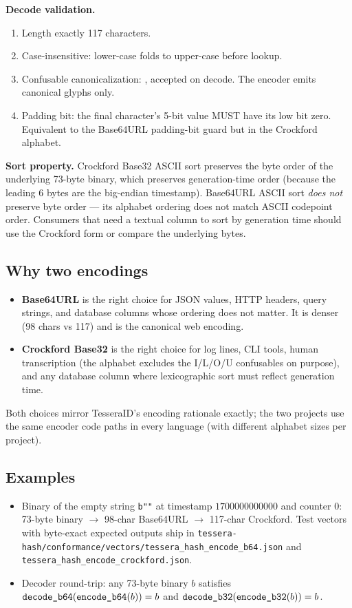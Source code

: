 \textbf{Decode validation.}
\begin{enumerate}
  \item Length exactly 117 characters.
  \item Case-insensitive: lower-case folds to upper-case before lookup.
  \item Confusable canonicalization: ,  accepted on decode. The encoder emits canonical glyphs only.
  \item Padding bit: the final character's 5-bit value MUST have its low bit zero. Equivalent to the Base64URL padding-bit guard but in the Crockford alphabet.
\end{enumerate}

\textbf{Sort property.} Crockford Base32 ASCII sort preserves the byte order of the underlying 73-byte binary, which preserves generation-time order (because the leading 6 bytes are the big-endian timestamp). Base64URL ASCII sort \emph{does not} preserve byte order --- its alphabet ordering does not match ASCII codepoint order. Consumers that need a textual column to sort by generation time should use the Crockford form or compare the underlying bytes.

\subsection{Why two encodings}

\begin{itemize}
  \item \textbf{Base64URL} is the right choice for JSON values, HTTP headers, query strings, and database columns whose ordering does not matter. It is denser (98 chars vs 117) and is the canonical web encoding.
  \item \textbf{Crockford Base32} is the right choice for log lines, CLI tools, human transcription (the alphabet excludes the I/L/O/U confusables on purpose), and any database column where lexicographic sort must reflect generation time.
\end{itemize}

Both choices mirror TesseraID's encoding rationale exactly; the two projects use the same encoder code paths in every language (with different alphabet sizes per project).

\subsection{Examples}

\begin{itemize}
\item Binary \tesserahash{} of the empty string \texttt{b""} at timestamp $1700000000000$ and counter $0$:\\
73-byte binary $\to$ 98-char Base64URL $\to$ 117-char Crockford. Test vectors with byte-exact expected outputs ship in \texttt{tessera-hash/conformance/vectors/tessera\_hash\_encode\_b64.json} and \texttt{tessera\_hash\_encode\_crockford.json}.
\item Decoder round-trip: any 73-byte binary $b$ satisfies $\texttt{decode\_b64}(\texttt{encode\_b64}(b)) = b$ and $\texttt{decode\_b32}(\texttt{encode\_b32}(b)) = b$.
\end{itemize}
